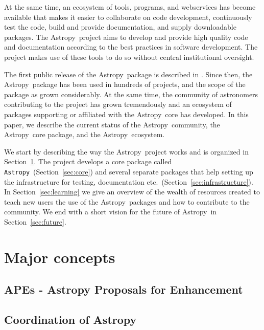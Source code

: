 \documentclass[modern]{aastex61}
\newcommand{\package}[1]{\texttt{#1}}
\newcommand{\astropy}{Astropy}
\newcommand{\astropypkg}{\package{Astropy}}
\newcommand{\sectionname}{Section}
\begin{document}
At the same time, an ecosystem of tools, programs, and webservices
has become available that makes it easier to collaborate on code development,
continuously test the code, build and provide documentation, and
supply downloadable packages. The \astropy\ project aims to develop and
provide high quality code and documentation according to the best
practices in software development. The project makes use of these
tools to do so without central institutional oversight.

The first public release of the \astropy\ package is described in
\cite{astropy}. Since then, the \astropy\ package has been
used in hundreds of projects, and the scope of the package as grown
considerably. At the same time, the community of astronomers
contributing to the project has grown tremendously and an ecosystem
of packages supporting or affiliated with the \astropy\ core has
developed. In this paper, we describe the current status of the
\astropy\ community, the \astropy\ core package, and the \astropy\
ecosystem.

We start by describing the way the \astropy\ project works and is
organized in \sectionname~\ref{sec:concepts}.  The project develops a core
package called \astropypkg\ (\sectionname~\ref{sec:core}) and several
separate packages that help setting up the infrastructure for testing,
documentation etc.\ (\sectionname~\ref{sec:infrastructure}). In
\sectionname~\ref{sec:learning} we give an overview of the wealth of
resources created to teach new users the use of the \astropy\ packages
and how to contribute to the community. We end with a short vision for
the future of \astropy\ in \sectionname~\ref{sec:future}.



\section{Major concepts}
\label{sec:concepts}
\subsection{APEs - Astropy Proposals for Enhancement}

\subsection{Coordination of Astropy}
\end{document}
